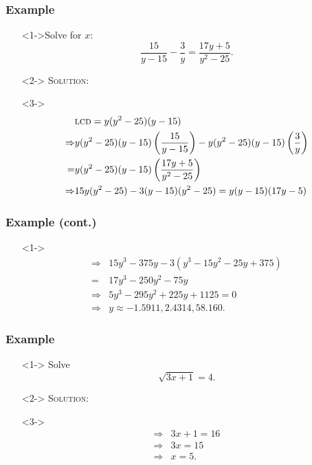 \documentclass[handout]{beamer}
\begin{document}
\begin{frame}
	\frametitle{Example}
	\begin{enumerate}
		\item[]<1->Solve for $x$:
		\[
			\frac{15}{y-15}-\frac{3}{y}=\frac{17y+5}{y^{2}-25}.
		\]
		\item[]<2-> \textsc{Solution:}
		\item[]<3->
		\begin{align*}
		& \text{\textsc{lcd}}=y(y^{2}-25)(y-15) \\
		\Rightarrow & y(y^{2}-25)(y-15)\left( \frac{15}{y-15} \right)-y(y^{2}-25)(y-15)\left( \frac{3}{y} \right)  \\
		= & y(y^{2}-25)(y-15)\left( \frac{17y+5}{y^{2}-25} \right)  \\
		\Rightarrow &15y(y^{2}-25)-3(y-15)(y^{2}-25)=y(y-15)(17y-5)
		\end{align*}
	\end{enumerate}
\end{frame}

\begin{frame}
	\frametitle{Example (cont.)}
	\begin{enumerate}
		\item[]<1->
		\begin{align*}
		\Rightarrow & 15y^{3}-375y-3(y^{3}-15y^{2}-25y+ 375) \\
			 =& 17y^{3}-250y^{2}-75y  \\
		 		\Rightarrow & 5y^{3}-295y^{2}+225y+1125=0 \\
		\Rightarrow & y \approx -1.5911, 2.4314, 58.160.
		\end{align*}
	\end{enumerate}
\end{frame}

\begin{frame}
	\frametitle{Example}
	\begin{enumerate}
		\item[]<1-> Solve
		\[
			\sqrt{3x+1}=4.
		\]
		\item[]<2-> \textsc{Solution:}
		\item[]<3->
			\begin{align*}
				\Rightarrow & 3x+1=16 \\
				\Rightarrow & 3x=15 \\
				\Rightarrow & x=5.
			\end{align*}
	\end{enumerate}
\end{frame}
\end{document}
